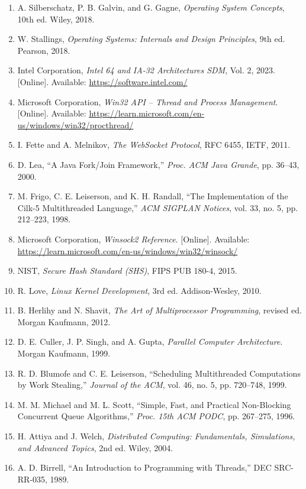 \documentclass[12pt,a4paper]{article}
\begin{document}
\begin{enumerate}
  \item A. Silberschatz, P. B. Galvin, and G. Gagne, \textit{Operating System Concepts}, 10th ed. Wiley, 2018.
  \item W. Stallings, \textit{Operating Systems: Internals and Design Principles}, 9th ed. Pearson, 2018.
  \item Intel Corporation, \textit{Intel 64 and IA-32 Architectures SDM}, Vol. 2, 2023. [Online]. Available: \url{https://software.intel.com/}
  \item Microsoft Corporation, \textit{Win32 API -- Thread and Process Management}. [Online]. Available: \url{https://learn.microsoft.com/en-us/windows/win32/procthread/}
  \item I. Fette and A. Melnikov, \textit{The WebSocket Protocol}, RFC 6455, IETF, 2011.
  \item D. Lea, ``A Java Fork/Join Framework,'' \textit{Proc. ACM Java Grande}, pp. 36--43, 2000.
  \item M. Frigo, C. E. Leiserson, and K. H. Randall, ``The Implementation of the Cilk-5 Multithreaded Language,'' \textit{ACM SIGPLAN Notices}, vol. 33, no. 5, pp. 212--223, 1998.
  \item Microsoft Corporation, \textit{Winsock2 Reference}. [Online]. Available: \url{https://learn.microsoft.com/en-us/windows/win32/winsock/}
  \item NIST, \textit{Secure Hash Standard (SHS)}, FIPS PUB 180-4, 2015.
  \item R. Love, \textit{Linux Kernel Development}, 3rd ed. Addison-Wesley, 2010.
  \item B. Herlihy and N. Shavit, \textit{The Art of Multiprocessor Programming}, revised ed. Morgan Kaufmann, 2012.
  \item D. E. Culler, J. P. Singh, and A. Gupta, \textit{Parallel Computer Architecture}. Morgan Kaufmann, 1999.
  \item R. D. Blumofe and C. E. Leiserson, ``Scheduling Multithreaded Computations by Work Stealing,'' \textit{Journal of the ACM}, vol. 46, no. 5, pp. 720--748, 1999.
  \item M. M. Michael and M. L. Scott, ``Simple, Fast, and Practical Non-Blocking Concurrent Queue Algorithms,'' \textit{Proc. 15th ACM PODC}, pp. 267--275, 1996.
  \item H. Attiya and J. Welch, \textit{Distributed Computing: Fundamentals, Simulations, and Advanced Topics}, 2nd ed. Wiley, 2004.
  \item A. D. Birrell, ``An Introduction to Programming with Threads,'' DEC SRC-RR-035, 1989.

\end{enumerate}
\end{document}

